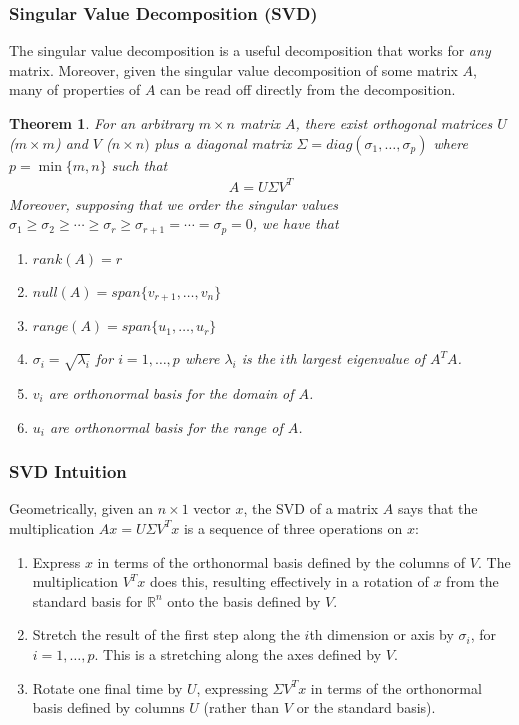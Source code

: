 \documentclass[12pt]{article}
\numberwithin{equation}{section} %
\theoremstyle{plain}
\newtheorem{thm}{Theorem}[section]
\theoremstyle{definition}
\theoremstyle{remark}
\begin{document}
\clearpage
\subsubsection{Singular Value Decomposition (SVD)}

The singular value decomposition is a useful decomposition that works
for \emph{any} matrix. Moreover, given the singular value decomposition
of some matrix $A$, many of properties of $A$ can be read off directly
from the decomposition.

\begin{thm}
For an arbitrary $m\times n$ matrix $A$, there exist orthogonal matrices
$U$ ($m\times m$) and $V$ ($n\times n)$ plus a diagonal matrix
$\Sigma=diag(\sigma_1, \ldots,\sigma_p)$ where $p=\min\{m,n\}$ such
that
\begin{align*}
  A = U\Sigma V^T
\end{align*}
Moreover, supposing that we order the singular values $\sigma_1 \geq
\sigma_2\geq\cdots\geq \sigma_r\geq \sigma_{r+1}=\cdots = \sigma_p=0$,
we have that
\begin{enumerate}
\item $rank(A)=r$
\item $null(A)=span\{v_{r+1},\ldots,v_n\}$
\item $range(A)=span\{u_{1},\ldots,u_r\}$
\item $\sigma_i = \sqrt{\lambda_i}$ for $i=1,\ldots,p$ where $\lambda_i$
  is the $i$th largest eigenvalue of $A^TA$.
\item $v_i$ are orthonormal basis for the domain of $A$.
\item $u_i$ are orthonormal basis for the range of $A$.
\end{enumerate}
\end{thm}

\subsubsection{SVD Intuition}

Geometrically, given an $n\times 1$ vector $x$, the SVD of a matrix $A$
says that the multiplication $Ax = U\Sigma V^T x$ is a sequence of three
operations on $x$:
\begin{enumerate}
\item Express $x$ in terms of the orthonormal basis defined by the
  columns of $V$. The multiplication $V^T x$ does this, resulting
  effectively in a rotation of $x$ from the standard basis for
  $\mathbb{R}^n$ onto the basis defined by $V$.
\item Stretch the result of the first step along the $i$th dimension or
  axis by $\sigma_i$, for $i=1,\ldots,p$. This is a stretching along the
  axes defined by $V$.
\item Rotate one final time by $U$, expressing $\Sigma V^Tx$ in terms of
  the orthonormal basis defined by columns $U$ (rather than $V$ or the
  standard basis).
\end{enumerate}
\end{document}
